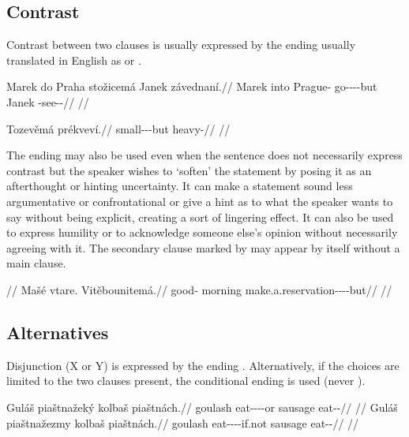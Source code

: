 \subsection{Contrast}
\label{sec:conj-contrast}

Contrast between two clauses is usually expressed by the ending 
usually translated in English as  or .

\pex
\begingl
  \gla Marek do Praha stožicemá Janek závednaní.//
  \glb Marek into Prague-\Acc{} go-\Av{}-\Pf{}-\Cnj{}-but Janek \Neg{}-see-\Pv{}-\Ret{}//
  \glft {}//
\endgl
\xe

\pex
\begingl
  \gla Tozevěmá prékveví.//
  \glb small-\Cont{}-\Cnj{}-but heavy-\Cont{}//
  \glft {}//
\endgl
\xe

The ending  may also be used even when the sentence does not
necessarily express contrast but the speaker wishes to `soften' the statement by
posing it as an afterthought or hinting uncertainty. It can make a statement
sound less argumentative or confrontational or give a hint as to what the
speaker wants to say without being explicit, creating a sort of lingering
effect. It can also be used to express humility or to acknowledge someone else's
opinion without necessarily agreeing with it. The secondary clause marked by
 may appear by itself without a main clause.

\pex
\begingl
  \glpreamble {}//
  \gla Mašé vtare. Vitěbounitemá.//
  \glb good-\Att{} morning make.a.reservation-\Lv{}-\SupP{}-\Cnj{}-but//
  \glft {}//
\endgl
\xe


\subsection{Alternatives}
\label{sec:conj-alternatives}

Disjunction (X or Y) is expressed by the ending . Alternatively,
if the choices are limited to the two clauses present, the conditional ending
 is used (never ).

\pex
\a\begingl
  \gla Guláš piaštnažeký kolbaš piaštnách.//
  \glb goulash eat-\Pv{}-\Ctp{}-\Cnj{}-or sausage eat-\Pv{}-\Ctp{}//
  \glft {}//
\endgl
\a\begingl
  \gla Guláš piaštnažezmy kolbaš piaštnách.//
  \glb goulash eat-\Pv{}-\Ctp{}-\Cnj{}-if.not sausage eat-\Pv{}-\Ctp{}//
  \glft {}//
\endgl
\xe

